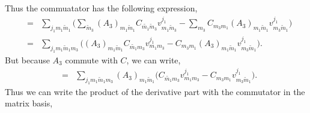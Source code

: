 \documentclass[a4paper,11pt]{article} %
\numberwithin{equation}{section} %
\numberwithin{figure}{section} %
\theoremstyle{plain} %
\theoremstyle{definition} %
\theoremstyle{remark} %
\begin{document}
Thus the commuatator has the following expression,
\begin{eqnarray*}
 [A_3,C] &=& \sum_{j_1 m_1 \tilde{m}_1} \Bigg( \sum_{\tilde{m}_3} (A_3)_{m_1 \tilde{m}_1} C_{\tilde{m_1} \tilde{m}_3} v^{j_1}_{m_1 \tilde{m}_3} - \sum_{m_3} C_{m_3 m_1} (A_3)_{m_1 \tilde{m}_1} v^{j_1}_{m_3 \tilde{m}_1} \Bigg) \\
         &=& \sum_{j_1 m_1 \tilde{m}_1 m_3} \Bigg( (A_3)_{m_1 \tilde{m}_1} C_{\tilde{m_1} m_3} v^{j_1}_{m_1 m_3} - C_{m_3 m_1} (A_3)_{m_1 \tilde{m}_1} v^{j_1}_{m_3 \tilde{m}_1} \Bigg). 
\end{eqnarray*}
But because $A_3$ commute with $C$, we can write,
\begin{eqnarray*}
 [A_3,C] &=& \sum_{j_1 m_1 \tilde{m}_1 m_3} (A_3)_{m_1 \tilde{m}_1}  \Bigg( C_{\tilde{m_1} m_3} v^{j_1}_{m_1 m_3} - C_{m_3 m_1} v^{j_1}_{m_3 \tilde{m}_1} \Bigg). 
\end{eqnarray*}
Thus we can write the product of the derivative part with the commutator in the matrix basis,
\end{document}
